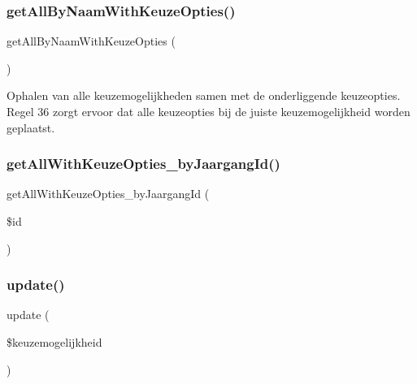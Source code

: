 \subsubsection{\texorpdfstring{get\+All\+By\+Naam\+With\+Keuze\+Opties()}{getAllByNaamWithKeuzeOpties()}}
{\footnotesize\ttfamily get\+All\+By\+Naam\+With\+Keuze\+Opties (\begin{DoxyParamCaption}{ }\end{DoxyParamCaption})}



Ophalen van alle keuzemogelijkheden samen met de onderliggende keuzeopties. Regel 36 zorgt ervoor dat alle keuzeopties bij de juiste keuzemogelijkheid worden geplaatst. 

\mbox{\label{class_keuzemogelijkheid___model_afee956c75c2fe9966783b18602ace19a}} 
\subsubsection{\texorpdfstring{get\+All\+With\+Keuze\+Opties\+\_\+by\+Jaargang\+Id()}{getAllWithKeuzeOpties\_byJaargangId()}}
{\footnotesize\ttfamily get\+All\+With\+Keuze\+Opties\+\_\+by\+Jaargang\+Id (\begin{DoxyParamCaption}\item[{}]{\$id }\end{DoxyParamCaption})}

\mbox{\label{class_keuzemogelijkheid___model_a933a162ba87e58d4cc7eb781fd571a7a}} 
\subsubsection{\texorpdfstring{update()}{update()}}
{\footnotesize\ttfamily update (\begin{DoxyParamCaption}\item[{}]{\$keuzemogelijkheid }\end{DoxyParamCaption})}



